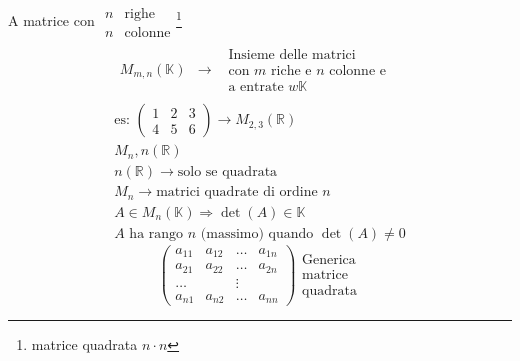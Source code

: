 A matrice con $
\begin{array}{|c|c}
  n & \text{righe}\\
  n & \text{colonne}
\end{array}
$\footnote{matrice quadrata $n\cdot n$}
\begin{eqnarray*}
 \begin{array}{ccc}
  M_{m,n}(\mathds{K})&\to&
                           \begin{array}{l}
                             \text{Insieme delle matrici}\\
                             \text{con $m$ riche e $n$ colonne e}\\
                             \text{a entrate $w\mathds{K}$}
                           \end{array}
 \end{array}\\
  \text{es: }
  \begin{pmatrix}
    1 & 2 & 3 \\
    4 & 5 & 6
  \end{pmatrix}\to M_{2,3}(\mathds{R})\\
  M_{n},n(\mathds{R})\\
  n(\mathds{R})\to \text{solo se quadrata}\\
  M_{n}\to \text{matrici quadrate di ordine } n\\
  \boxed{A\in M_n(\mathds{K})\Rightarrow \det(A)\in \mathds{K}}\\
  A \text{ ha rango } n \text{ (massimo) quando }\det(A)\neq 0
\end{eqnarray*}
\begin{equation*}
  \begin{pmatrix}
    a_{11} & a_{12} &\dots & a_{1n}\\
    a_{21} & a_{22} &\dots & a_{2n}\\
    \dots & &\vdots\\
    a_{n1} & a_{n2} &\dots & a_{nn} 
  \end{pmatrix}
  \begin{array}{c}
    \text{Generica}\\
    \text{matrice}\\
    \text{quadrata}
  \end{array}
\end{equation*}
